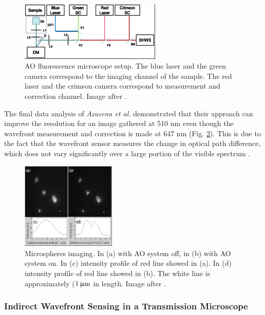 \begin{figure}[htbp]
	\centering
			\includegraphics[width=0.60\textwidth]{images/Setup_widefield_direct.JPG}
		\caption{AO fluorescence microscope setup. The blue laser and the green camera correspond to the imaging channel of the sample. The red laser and the crimson camera correspond to measurement and correction channel. Image after \cite{wide_directSensing_microscope}.}
	\label{fig:Setup_widefield_direct}
\end{figure}


The final data analysis of \emph{Azucena et al.}  demonstrated that their approach can improve the resolution for an image gathered at 510 nm even though the wavefront measurement and correction is made at 647 nm (Fig. \ref{fig:wide_direct_results}). This is due to the fact that the wavefront sensor measures the change in optical
path difference, which does not vary significantly over a large portion of the visible spectrum \cite{wide_directSensing_microscope}.

\begin{figure}[htbp]
	\centering
		\includegraphics[width=0.40\textwidth]{images/wide_direct_results.JPG}
		\caption{Microspheres imaging. In (a) with AO system off, in (b) with AO system on. In (c) intensity profile of red line showed in (a). In (d) intensity profile of red line showed in (b). The white line is approximately ($\unit[1]{\upmu m}$ in length. Image after \cite{wide_directSensing_microscope}.}
	\label{fig:wide_direct_results}
\end{figure}


\subsubsection{Indirect Wavefront Sensing in a Transmission Microscope}
\label{sec:TransmissionMicroscope}

